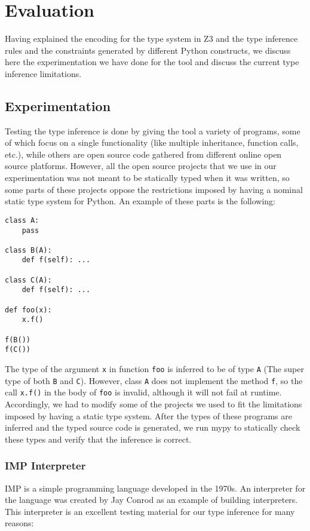 
\chapter{Evaluation}\label{chapter:eval}
Having explained the encoding for the type system in Z3 and the type inference rules and the constraints generated by different Python constructs, we discuss here the experimentation we have done for the tool and discuss the current type inference limitations.

\section{Experimentation}
Testing the type inference is done by giving the tool a variety of programs, some of which focus on a single functionality (like multiple inheritance, function calls, etc.), while others are open source code gathered from different online open source platforms. However, all the open source projects that we use in our experimentation was not meant to be statically typed when it was written, so some parts of these projects oppose the restrictions imposed by having a nominal static type system for Python. An example of these parts is the following:

\begin{lstlisting}
class A:
	pass
	
class B(A):
	def f(self): ...

class C(A):
	def f(self): ...

def foo(x):
	x.f()
	
f(B())
f(C())
\end{lstlisting}

The type of the argument \lstinline|x| in function \lstinline|foo| is inferred to be of type \lstinline|A| (The super type of both \lstinline|B| and \lstinline|C|). However, class \lstinline|A| does not implement the method \lstinline|f|, so the call \lstinline|x.f()| in the body of \lstinline|foo| is invalid, although it will not fail at runtime. Accordingly, we had to modify some of the projects we used to fit the limitations imposed by having a static type system. After the types of these programs are inferred and the typed source code is generated, we run mypy \cite{mypy} to statically check these types and verify that the inference is correct.
\subsection{IMP Interpreter}
IMP \cite{imp} is a simple programming language developed in the 1970s. An interpreter for the language \cite{imp_i} was created by Jay Conrod as an example of building interpreters. This interpreter is an excellent testing material for our type inference for many reasons:

